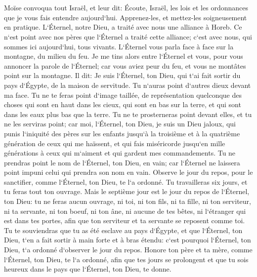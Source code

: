 \chapter{}

\verse Moïse convoqua tout Israël, et leur dit: Écoute, Israël, les lois et les ordonnances que je vous fais entendre aujourd`hui. Apprenez-les, et mettez-les soigneusement en pratique. 
\verse L`Éternel, notre Dieu, a traité avec nous une alliance à Horeb. 
\verse Ce n`est point avec nos pères que l`Éternel a traité cette alliance; c`est avec nous, qui sommes ici aujourd`hui, tous vivants. 
\verse L`Éternel vous parla face à face sur la montagne, du milieu du feu. 
\verse Je me tins alors entre l`Éternel et vous, pour vous annoncer la parole de l`Éternel; car vous aviez peur du feu, et vous ne montâtes point sur la montagne. Il dit: 
\verse Je suis l`Éternel, ton Dieu, qui t`ai fait sortir du pays d`Égypte, de la maison de servitude. 
\verse Tu n`auras point d`autres dieux devant ma face. 
\verse Tu ne te feras point d`image taillée, de représentation quelconque des choses qui sont en haut dans les cieux, qui sont en bas sur la terre, et qui sont dans les eaux plus bas que la terre. 
\verse Tu ne te prosterneras point devant elles, et tu ne les serviras point; car moi, l`Éternel, ton Dieu, je suis un Dieu jaloux, qui punis l`iniquité des pères sur les enfants jusqu`à la troisième et à la quatrième génération de ceux qui me haïssent, 
\verse et qui fais miséricorde jusqu`en mille générations à ceux qui m`aiment et qui gardent mes commandements. 
\verse Tu ne prendras point le nom de l`Éternel, ton Dieu, en vain; car l`Éternel ne laissera point impuni celui qui prendra son nom en vain. 
\verse Observe le jour du repos, pour le sanctifier, comme l`Éternel, ton Dieu, te l`a ordonné. 
\verse Tu travailleras six jours, et tu feras tout ton ouvrage. 
\verse Mais le septième jour est le jour du repos de l`Éternel, ton Dieu: tu ne feras aucun ouvrage, ni toi, ni ton fils, ni ta fille, ni ton serviteur, ni ta servante, ni ton boeuf, ni ton âne, ni aucune de tes bêtes, ni l`étranger qui est dans tes portes, afin que ton serviteur et ta servante se reposent comme toi. 
\verse Tu te souviendras que tu as été esclave au pays d`Égypte, et que l`Éternel, ton Dieu, t`en a fait sortir à main forte et à bras étendu: c`est pourquoi l`Éternel, ton Dieu, t`a ordonné d`observer le jour du repos. 
\verse Honore ton père et ta mère, comme l`Éternel, ton Dieu, te l`a ordonné, afin que tes jours se prolongent et que tu sois heureux dans le pays que l`Éternel, ton Dieu, te donne. 
